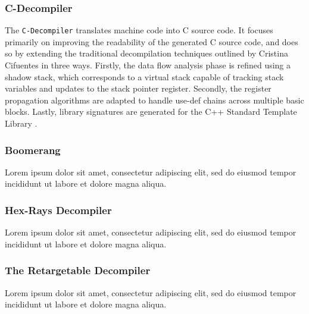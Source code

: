 \documentclass[12pt, a4paper]{article}
\begin{document}
\subsubsection{C-Decompiler}

The \texttt{C-Decompiler} translates machine code into C source code. It focuses primarily on improving the readability of the generated C source code, and does so by extending the traditional decompilation techniques outlined by Cristina Cifuentes in three ways. Firstly, the data flow analysis phase is refined using a shadow stack, which corresponds to a virtual stack capable of tracking stack variables and updates to the stack pointer register. Secondly, the register propagation algorithms are adapted to handle use-def chains across multiple basic blocks. Lastly, library signatures are generated for the C++ Standard Template Library \cite{readable_decomp}.


\subsubsection{Boomerang}

Lorem ipsum dolor sit amet, consectetur adipiscing elit, sed do eiusmod tempor incididunt ut labore et dolore magna aliqua.

\cite{boomerang}


\subsubsection{Hex-Rays Decompiler}

Lorem ipsum dolor sit amet, consectetur adipiscing elit, sed do eiusmod tempor incididunt ut labore et dolore magna aliqua.

\cite{hexrays}


\subsubsection{The Retargetable Decompiler}


Lorem ipsum dolor sit amet, consectetur adipiscing elit, sed do eiusmod tempor incididunt ut labore et dolore magna aliqua.
\end{document}
